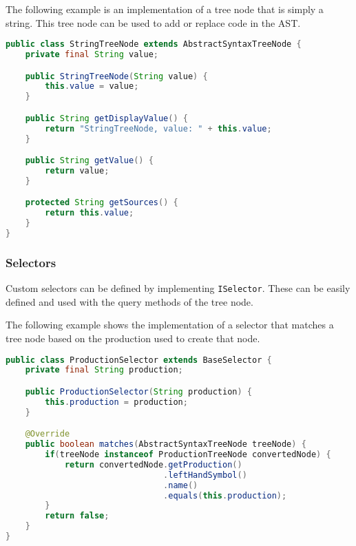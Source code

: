 The following example is an implementation of a tree node that is simply a string.
This tree node can be used to add or replace code in the AST.

\begin{lstlisting}[language=Java, caption=Implementation of StringTreeNode]
public class StringTreeNode extends AbstractSyntaxTreeNode {
    private final String value;

    public StringTreeNode(String value) {
        this.value = value;
    }

    public String getDisplayValue() {
        return "StringTreeNode, value: " + this.value;
    }

    public String getValue() {
        return value;
    }

    protected String getSources() {
        return this.value;
    }
}
\end{lstlisting}

\subsubsection{Selectors}

Custom selectors can be defined by implementing \verb|ISelector|. 
These can be easily defined and used with the query methods of the tree node.

The following example shows the implementation of a selector that matches a tree node based on the production used to create that node.

\begin{lstlisting}[language=Java,caption=Custom selector implementation]
public class ProductionSelector extends BaseSelector {
    private final String production;

    public ProductionSelector(String production) {
        this.production = production;
    }

    @Override
    public boolean matches(AbstractSyntaxTreeNode treeNode) {
        if(treeNode instanceof ProductionTreeNode convertedNode) {
            return convertedNode.getProduction()
                                .leftHandSymbol()
                                .name()
                                .equals(this.production);
        }
        return false;
    }
}
\end{lstlisting}
